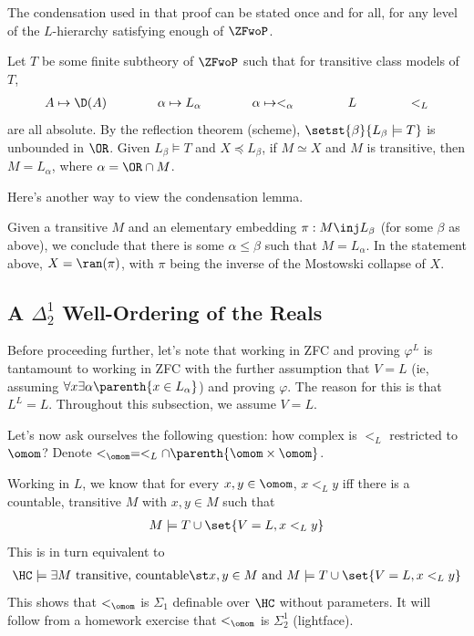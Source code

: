 The condensation used in that proof can be stated once and for all, for any level of the $L$-hierarchy satisfying enough of $\ZFwoP$.

\begin{boxlemma}
    Let $T$ be some finite subtheory of $\ZFwoP$ such that for transitive class models of $T$,
    \begin{align*}
        A \mapsto \D(A)
        \qquad \qquad
        \alpha \mapsto L_{\alpha}
        \qquad \qquad
        \alpha \mapsto <_{\alpha}
        \qquad \qquad
        L
        \qquad \qquad
        <_L
    \end{align*}
    are all absolute. By the reflection theorem (scheme), $\setst{\beta}{L_{\beta} \models T}$ is unbounded in $\OR$. Given $L_{\beta} \models T$ and $X \preceq L_{\beta}$, if $M \simeq X$ and $M$ is transitive, then $M = L_{\alpha}$, where $\alpha = \OR \cap M$.
\end{boxlemma}

Here's another way to view the condensation lemma.

Given a transitive $M$ and an elementary embedding $\pi : M \inj L_{\beta}$ (for some $\beta$ as above), we conclude that there is some $\alpha \leq \beta$ such that $M = L_{\alpha}$. In the statement above, $X = \ran(\pi)$, with $\pi$ being the inverse of the Mostowski collapse of $X$.

\subsection{A $\Delta^1_2$ Well-Ordering of the Reals}

Before proceeding further, let's note that working in ZFC and proving $\varphi^L$ is tantamount to working in ZFC with the further assumption that $V = L$ (ie, assuming $\forall x \exists \alpha \parenth{x \in L_{\alpha}}$) and proving $\varphi$. The reason for this is that $L^L = L$. Throughout this subsection, we assume $V = L$.

Let's now ask ourselves the following question: how complex is $<_L$ restricted to $\omom$? Denote $<_{\omom} = <_L \cap \parenth{\omom \times \omom}$.

Working in $L$, we know that for every $x, y \in \omom$, $x <_L y$ iff there is a countable, transitive $M$ with $x, y \in M$ such that
\begin{align*}
    M \models T \cup \set{V = L, x <_L y}
\end{align*}
This is in turn equivalent to
\begin{align*}
    \HC \models \exists M \text{ transitive, countable} \st x, y \in M \text{ and } M \models T \cup \set{V = L, x <_L y}
\end{align*}
This shows that $<_{\omom}$ is $\Sigma_1$ definable over $\HC$ without parameters. It will follow from a homework exercise that $<_{\omom}$ is $\Sigma_2^1$ (lightface).

